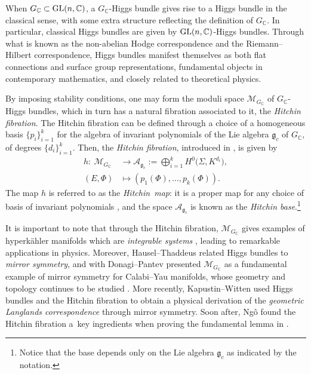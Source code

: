 \documentclass[10pt,a4paper]{amsart}
\numberwithin{equation}{section}
\begin{document}
When $ G_\mathbb{C}\subset {\rm GL}(n,\mathbb{C})$, a $ G_\mathbb{C}$-Higgs bundle gives rise to a Higgs bundle in the classical sense, with
some extra structure reflecting the definition of $ G_\mathbb{C}$. In particular, classical Higgs bundles are given by ${\rm GL}(n,\mathbb{C})$-Higgs bundles. Through what is known as the non-abelian Hodge correspondence \cite{cor,6,N1,57,yau} and the Riemann--Hilbert correspondence, Higgs bundles manifest themselves as both flat connections and surface group representations, fundamental objects in contemporary mathematics, and closely related to theoretical physics.

By imposing stability conditions, one may form the moduli space $\mathcal{M}_{ G_\mathbb{C}}$ of $G_\mathbb{C}$-Higgs bundles, which in turn has a natural fibration associated to it, the {\it Hitchin fibration}.
 The Hitchin fibration can be defined through a choice of a homogeneous basis $\{p_{i}\}_{i=1}^k$ for the algebra of invariant polynomials of the Lie algebra $\mathfrak{g}_{c}$ of $ G_\mathbb{C}$, of degrees $\{d_{i}\}_{i=1}^k$. Then, the {\em Hitchin fibration}, introduced in \cite{N2}, is given by
\begin{align}
 h\colon \ \mathcal{M}_{ G_\mathbb{C}}&\longrightarrow \mathcal{A}_{ \mathfrak{g}_c}:=\bigoplus_{i=1}^{k}H^{0}\big(\Sigma,K^{d_{i}}\big),\label{base1}\\
 (E,\Phi)&\mapsto (p_{1}(\Phi), \dots, p_{k}(\Phi)).\label{base2}
\end{align}
The map $h$ is referred to as the {\em Hitchin~map}: it is a proper map for any choice of basis of invariant polynomials \cite{N2}, and the space $\mathcal{A}_{ \mathfrak{g}_c}$ is known as the {\it Hitchin base}.\footnote{Notice that the base depends only on the Lie algebra $\mathfrak{g}_c$ as indicated by the notation.}

It is important to note that through the Hitchin fibration, $\mathcal{M}_{ G_\mathbb{C}}$ gives examples of hyperk\"ahler manifolds which are {\it integrable systems} \cite{N2}, leading to remarkable applications in physics.
Moreover, Hausel--Thaddeus \cite{Tamas1} related Higgs bundles to {\it mirror symmetry}, and with Donagi--Pantev presented $\mathcal{M}_{ G_\mathbb{C}}$ as a fundamental example of mirror symmetry for Calabi--Yau manifolds, whose geometry and topology continues to be studied \cite{dopa}. More recently, Kapustin--Witten \cite{Kap} used Higgs bundles and the Hitchin fibration to obtain a physical derivation of the {\it geometric Langlands correspondence} through mirror symmetry. Soon after, Ng\^{o} found the Hitchin fibration a~key ingredients when proving the fundamental lemma in \cite{ngo}.
\end{document}

